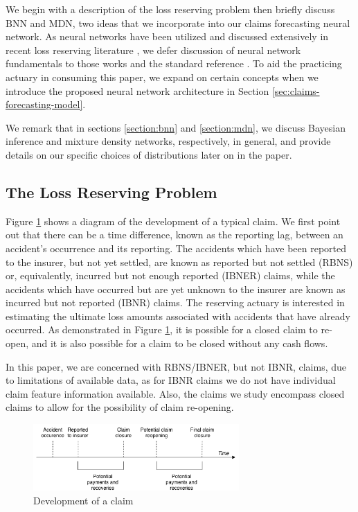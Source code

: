 \documentclass{article}
\begin{document}
We begin with a description of the loss reserving problem then briefly discuss 
BNN and MDN, two ideas that we incorporate into our claims forecasting neural 
network. As neural networks have been utilized and discussed extensively in 
recent loss reserving literature \cite{gabrielliNeuralNetwork2019a, 
gabrielliNeuralNetwork2019, kuoDeepTriangleDeep2018, wuthrichNeuralNetworks2018,
gabrielliIndividualClaims2018}, we defer discussion of neural network 
fundamentals to those works and the standard reference
\cite{goodfellowDeepLearning2016}. To aid the practicing actuary in consuming 
this paper, we expand on certain concepts when we introduce the proposed neural 
network architecture in Section \ref{sec:claims-forecasting-model}.

We remark that in sections \ref{section:bnn} and \ref{section:mdn}, we discuss 
Bayesian inference and mixture density networks, respectively, in general, and 
provide details on our specific choices of distributions later on in the paper.

\subsection{The Loss Reserving Problem}

Figure \ref{fig:claimrunoff} shows a diagram of the development of a typical
claim. We first point out that there can be a time difference, known as the 
reporting lag, between an accident's occurrence and its reporting. The accidents
which have been reported to the insurer, but not yet settled, are known as 
reported but not settled (RBNS) or, equivalently, incurred but not enough 
reported (IBNER) claims, while the accidents which have occurred but are yet
unknown to the insurer are known as incurred but not reported (IBNR) claims. The
reserving actuary is interested in estimating the ultimate loss amounts 
associated with accidents that have already occurred. As demonstrated in Figure
\ref{fig:claimrunoff}, it is possible for a closed claim to re-open, and it is
also possible for a claim to be closed without any cash flows.

In this paper, we are concerned with RBNS/IBNER, but not IBNR, claims, due to 
limitations of available data, as for IBNR claims we do not have individual 
claim feature information available. Also, the claims we study encompass closed 
claims to allow for the possibility of claim re-opening.

\begin{figure}
  \begin{center}
    \includegraphics[width=0.7\textwidth]{images/claim_runoff.png}
  \end{center}
  \caption{Development of a claim}
  \label{fig:claimrunoff}
\end{figure}
\end{document}
